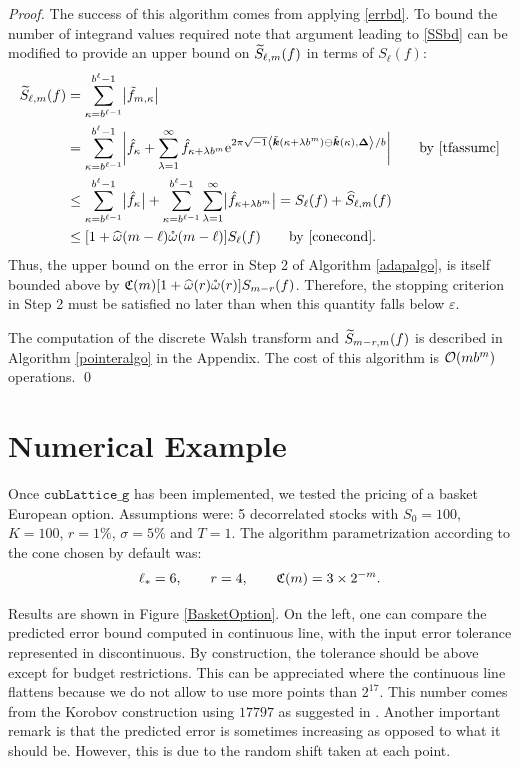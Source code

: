 \documentclass[graybox,footinfo]{svmult}
\newcommand{\bsDelta}{\boldsymbol{\Delta}}    %
\begin{document}
\begin{proof}
The success of this algorithm comes from applying \eqref{errbd}.  To bound the number of integrand values required note that argument leading to \eqref{SSbd} can be modified to provide an upper bound on $\widetilde{S}_{\ell,m}(f)$ in terms of $S_{\ell}(f)$:
\begin{align}
\nonumber
\tS_{\ell,m}(f) &= \sum_{\kappa=b^{\ell-1}}^{b^{\ell}-1} \bigabs{ \tf_{m,\kappa}}\\
\nonumber
& = \sum_{\kappa=b^{\ell-1}}^{b^{\ell}-1} \biggabs{\hf_{\kappa} + \sum_{\lambda=1}^{\infty} \hf_{\kappa+\lambda b^{m}} \E^{2 \pi \sqrt{-1} \ip{\tvk(\kappa+\lambda b^{m}) \ominus \tvk(\kappa)}{\bsDelta}/b}} \qquad \text{by \eqref{tfassumc}}\\
\nonumber
&\le \sum_{\kappa=b^{\ell-1}}^{b^{\ell}-1} \bigabs{\hf_{\kappa}} + \sum_{\kappa=b^{\ell-1}}^{b^{\ell}-1} \sum_{\lambda=1}^{\infty} \bigabs{\hf_{\kappa+\lambda b^{m}}} 
= S_{\ell}(f) + \hS_{\ell,m}(f) \\
\nonumber
&\le [1  + \homega(m-\ell) \wcomega(m-\ell)] S_\ell(f) \qquad \text{by \eqref{conecond}}. \label{SSbd3}
\end{align}
Thus, the upper bound on the error in Step 2 of Algorithm \ref{adapalgo}, is itself bounded above by $\mathfrak{C}(m) [1  + \widehat{\omega}(r) \mathring{\omega}(r)] S_{m-r}(f)$.  Therefore, the stopping criterion in Step 2 must be satisfied no later than when this quantity falls below $\varepsilon$. 

The computation of the discrete Walsh transform and $\widetilde{S}_{m-r,m}(f)$ is described in Algorithm \ref{pointeralgo} in the Appendix.  The cost of this algorithm is $\mathcal{O}(mb^m)$ operations. \hfill \qed
\end{proof}


\section{Numerical Example} \label{numexpsec}

Once $\texttt{cubLattice\_g}$ has been implemented, we tested the pricing of a basket European option. Assumptions were: 5 decorrelated stocks with $S_0=100$, $K=100$, $r=1\%$, $\sigma=5\%$ and $T=1$. The algorithm parametrization according to the cone chosen by default was:
\[
\ell_*=6, \qquad r=4, \qquad \mathfrak{C}(m)=3 \times 2^{-m}.
\]

Results are shown in Figure \ref{BasketOption}. On the left, one can compare the predicted error bound computed in continuous line, with the input error tolerance represented in discontinuous. By construction, the tolerance should be above except for budget restrictions. This can be appreciated where the continuous line flattens because we do not allow to use more points than $2^17$. This number comes from the Korobov construction using $17797$ as suggested in \cite{HicEtal00}. Another important remark is that the predicted error is sometimes increasing as opposed to what it should be. However, this is due to the random shift taken at each point.
\end{document}

